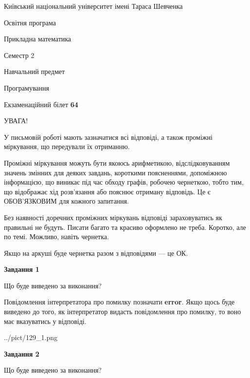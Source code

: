 \documentclass[12pt, ukrainian]{article}
\begin{document}
{{\begin {small}\par
{ \center  Київський національний університет імені Тараса Шевченка \par}
{\parbox {5 cm}{Освітня програма \hfill}{\parbox {7 cm}{Прикладна математика \hfill}}\parbox {6 cm}{\hfill Семестр 2}}\par
{\parbox {5 cm} {Навчальний предмет \hfill}\parbox {7 cm}{Програмування \hfill}\parbox {6cm}{\hfill}\par}\vspace{-7pt} \end{small}}{\center Екзаменаційний білет \No \textbf
{ 64 }\par}}
{
\begin {large}
УВАГА!

У письмовій роботі мають зазначатися всі відповіді, а також проміжні міркування, що передували їх отриманню.

Проміжні міркування можуть бути якоюсь арифметикою, відслідковуванням зна\-чень змінних для деяких завдань,
короткими поясненнями, допоміжною інформацією, що виникає під час обходу графів, робочею чернеткою,
тобто тим, що відображає хід розв’язання або пояснює отриману відповідь.
Це є ОБОВ’ЯЗКОВИМ для кожного запитання.

Без наявності доречних проміжних міркувань відповіді зараховуватись як правиль\-ні не будуть.
Писати багато та красиво оформлено не треба. Коротко, але по темі. Можли\-во, навіть чернетка.

Якщо на аркуші буде чернетка разом з відповідями --- це ОК.

\newpage

{\begin {center}\textbf{Завдання 1}\end {center}}\par
Що буде виведено за виконання?

Повідомлення інтерпретатора про помилку позначати \textbf{error}.
Якщо щось буде виведено до того, як інтерпретатор видасть повідомлення про помилку, 
то воно має вказуватись у відповіді. \par


\begin{center}
	{../pict/129_1.png}
\end{center}
\newpage

{\begin {center}\textbf{Завдання 2}\end {center}}\par
Що буде виведено за виконання?


\end{large}}
\end{document}
